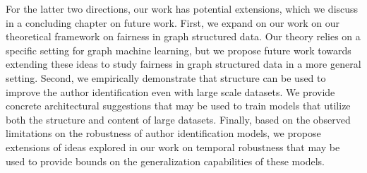 For the latter two directions, our work has potential extensions, which we discuss in a concluding chapter on future work.
First, we expand on our work on our theoretical framework on fairness in graph structured data.
Our theory relies on a specific setting for graph machine learning, but we propose future work towards extending these ideas to study fairness in graph structured data in a more general setting.
Second, we empirically demonstrate that structure can be used to improve the author identification even with large scale datasets.
We provide concrete architectural suggestions that may be used to train models that utilize both the structure and content of large datasets.
Finally, based on the observed limitations on the robustness of author identification models, we propose extensions of ideas explored in our work on temporal robustness that may be used to provide bounds on the generalization capabilities of these models.

\endinput